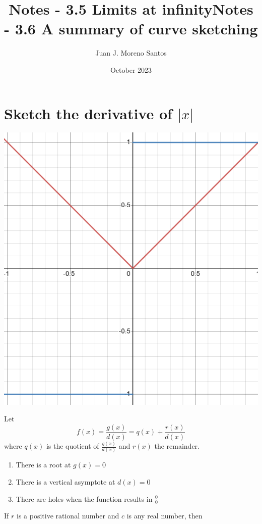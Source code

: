 \documentclass[11pt]{article}
\title{Notes - 3.5 Limits at infinity}
\author{Juan J. Moreno Santos}
\date{October 2023}
\begin{document}
\maketitle

\section{Sketch the derivative of $\left\lvert x \right\rvert$}
\includegraphics{W.png}

Let \[f(x)=\frac{g(x)}{d(x)}=q(x)+\frac{r(x)}{d(x)}\] where $q(x)$ is the quotient of $\frac{g(x)}{d(x)}$ and $r(x)$ the remainder.

\begin{enumerate}[]
    \item There is a root at $g(x)=0$
    \item There is a vertical asymptote at $d(x)=0$
    \item There are holes when the function results in $\frac{0}{0}$
\end{enumerate}

If $r$ is a positive rational number and $c$ is any real number, then



\title{Notes - 3.6 A summary of curve sketching}
\end{document}
